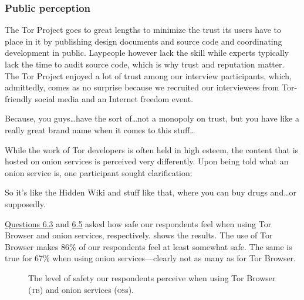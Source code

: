 \subsubsection{Public perception}

The Tor Project goes to great lengths to minimize the trust its users have to
place in it by publishing design documents and source code and coordinating
development in public.  Laypeople however lack the skill while experts typically
lack the time to audit source code, which is why trust and reputation matter.
The Tor Project enjoyed a lot of trust among our interview participants, which,
admittedly, comes as no surprise because we recruited our interviewees from
Tor-friendly social media and an Internet freedom event.

\begin{displayquote}[P08]
Because, you guys\dots have the sort of\dots not a monopoly on trust, but you
have like a really great brand name when it comes to this stuff\dots
\end{displayquote}

While the work of Tor developers is often held in high esteem, the content that
is hosted on onion services is perceived very differently.  Upon being told what
an onion service is, one participant sought clarification:

\begin{displayquote}[P03]
So it's like the Hidden Wiki and stuff like that, where you can buy drugs
and\dots or supposedly.
\end{displayquote}

\hyperref[q6_3]{Questions 6.3} and \hyperref[q6_5]{6.5} asked how safe our
respondents feel when using Tor Browser and onion services, respectively.
 shows the results.  The use of Tor Browser makes
86\% of our respondents feel at least somewhat safe.  The same is true for 67\%
when using onion services---clearly not as many as for Tor Browser.

\begin{figure}[t]
    \centering
    
    \caption{The level of safety our respondents perceive when using Tor
    Browser (\textsc{tb}) and onion services (\textsc{os}s).}
    \label{fig:perceived-security}
\end{figure}

